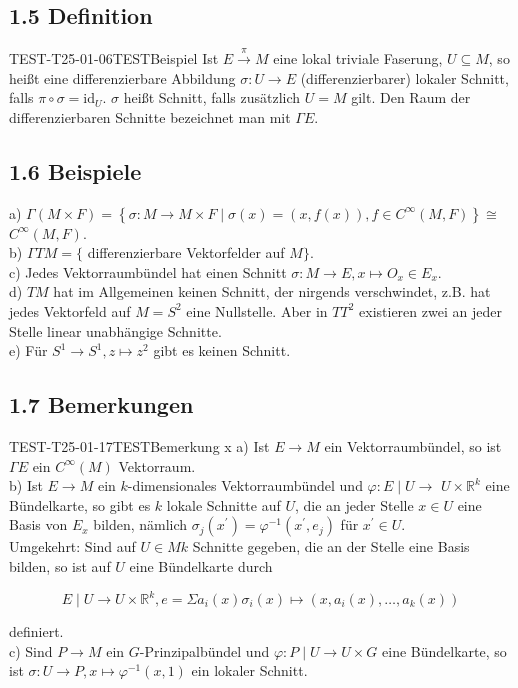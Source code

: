 \subsection*{1.5 Definition}
\begin{EXA}{TEST-T25-01-06}{TESTBeispiel}
Ist $E \xrightarrow{\pi} M$ eine lokal triviale Faserung, $U \subseteq M$, so heißt eine differenzierbare Abbildung $\sigma: U \rightarrow E$ (differenzierbarer) lokaler Schnitt, falls $\pi \circ \sigma=\mathrm{id}_{U}$. $\sigma$ heißt Schnitt, falls zusätzlich $U=M$ gilt. Den Raum der differenzierbaren Schnitte bezeichnet man mit $\Gamma E$.
\end{EXA}

\subsection*{1.6 Beispiele}
a) $\Gamma(M \times F)=\left\{\sigma: M \rightarrow M \times F \mid \sigma(x)=(x, f(x)), f \in C^{\infty}(M, F)\right\} \cong$ $C^{\infty}(M, F)$.\\
b) $\Gamma T M=\{$ differenzierbare Vektorfelder auf $M\}$.\\
c) Jedes Vektorraumbündel hat einen Schnitt $\sigma: M \rightarrow E, x \mapsto O_{x} \in E_{x}$.\\
d) $T M$ hat im Allgemeinen keinen Schnitt, der nirgends verschwindet, z.B. hat jedes Vektorfeld auf $M=S^{2}$ eine Nullstelle. Aber in $T T^{2}$ existieren zwei an jeder Stelle linear unabhängige Schnitte.\\
e) Für $S^{1} \rightarrow S^{1}, z \mapsto z^{2}$ gibt es keinen Schnitt.

\subsection*{1.7 Bemerkungen}
\begin{REM}{TEST-T25-01-17}{TESTBemerkung x}
a) Ist $E \rightarrow M$ ein Vektorraumbündel, so ist $\Gamma E$ ein $C^{\infty}(M)$ Vektorraum.\\
b) Ist $E \rightarrow M$ ein $k$-dimensionales Vektorraumbündel und $\varphi: E \mid U \rightarrow$ $U \times \mathbb{R}^{k}$ eine Bündelkarte, so gibt es $k$ lokale Schnitte auf $U$, die an jeder Stelle $x \in U$ eine Basis von $E_{x}$ bilden, nämlich $\sigma_{j}\left(x^{\prime}\right)=\varphi^{-1}\left(x^{\prime}, e_{j}\right)$ für $x^{\prime} \in U$.\\
Umgekehrt: Sind auf $U \in M k$ Schnitte gegeben, die an der Stelle eine Basis bilden, so ist auf $U$ eine Bündelkarte durch

$$
E \mid U \rightarrow U \times \mathbb{R}^{k}, e=\Sigma a_{i}(x) \sigma_{i}(x) \mapsto\left(x, a_{i}(x), \ldots, a_{k}(x)\right)
$$

definiert.\\
c) Sind $P \rightarrow M$ ein $G$-Prinzipalbündel und $\varphi: P \mid U \rightarrow U \times G$ eine Bündelkarte, so ist $\sigma: U \rightarrow P, x \mapsto \varphi^{-1}(x, 1)$ ein lokaler Schnitt.
\end{REM}

